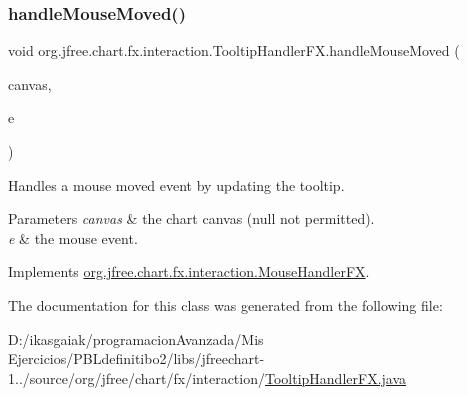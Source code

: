\subsubsection{\texorpdfstring{handle\+Mouse\+Moved()}{handleMouseMoved()}}
{\footnotesize\ttfamily void org.\+jfree.\+chart.\+fx.\+interaction.\+Tooltip\+Handler\+F\+X.\+handle\+Mouse\+Moved (\begin{DoxyParamCaption}\item[{\mbox{\hyperlink{classorg_1_1jfree_1_1chart_1_1fx_1_1_chart_canvas}{Chart\+Canvas}}}]{canvas,  }\item[{Mouse\+Event}]{e }\end{DoxyParamCaption})}

Handles a mouse moved event by updating the tooltip.


\begin{DoxyParams}{Parameters}
{\em canvas} & the chart canvas ({\ttfamily null} not permitted). \\
\hline
{\em e} & the mouse event. \\
\hline
\end{DoxyParams}


Implements \mbox{\hyperlink{interfaceorg_1_1jfree_1_1chart_1_1fx_1_1interaction_1_1_mouse_handler_f_x_a71fb6066ff587b62484100705777fc19}{org.\+jfree.\+chart.\+fx.\+interaction.\+Mouse\+Handler\+FX}}.



The documentation for this class was generated from the following file\+:\begin{DoxyCompactItemize}
\item 
D\+:/ikasgaiak/programacion\+Avanzada/\+Mis Ejercicios/\+P\+B\+Ldefinitibo2/libs/jfreechart-\/1../source/org/jfree/chart/fx/interaction/\mbox{\hyperlink{_tooltip_handler_f_x_8java}{Tooltip\+Handler\+F\+X.\+java}}\end{DoxyCompactItemize}
